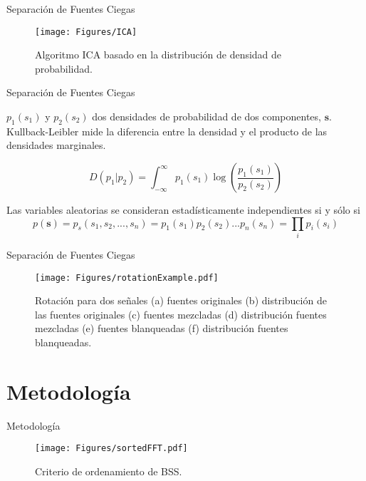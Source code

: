 \documentclass[10pt]{beamer}
\newcommand{\vect}[1]{\mathbf{#1}}
\begin{document}
\begin{frame}{Separación de Fuentes Ciegas}

\begin{figure}[ht]
\centering
\texttt{[image: Figures/ICA]}
\caption{Algoritmo ICA basado en la distribución de densidad de probabilidad.}
\label{ICA}
\end{figure}
\end{frame}

\begin{frame}{Separación de Fuentes Ciegas}


$p_1(s_1)$ y $p_2(s_2)$ dos densidades de probabilidad de dos componentes, $\vect{s}$.
Kullback-Leibler mide la diferencia entre la densidad y el producto de las densidades marginales.

\begin{equation}
    D(p_1|p_2)=\int_{-\infty}^{\infty}p_1(s_1)\log\left(\frac{p_1(s_1)}{p_2(s_2)}\right) 
\end{equation} 

Las variables aleatorias se consideran estadísticamente independientes si y sólo si
\begin{equation}
p(\vect{s})=p_{s}(s_{1},s_{2},...,s_{n})=p_{1}(s_{1})p_{2}(s_{2})...p_{n}(s_{n})=\prod_i{p_i(s_i)}
\end{equation}
    
    
\end{frame}




\begin{frame}{Separación de Fuentes Ciegas}
\begin{figure}[h]
\centering
\texttt{[image: Figures/rotationExample.pdf]}
\caption{Rotación para dos señales (a) fuentes originales (b) distribución de las fuentes originales (c) fuentes mezcladas (d) distribución fuentes mezcladas (e) fuentes blanqueadas (f) distribución fuentes blanqueadas. }
\label{SOS}
\end{figure}
\end{frame}

\section{Metodología}

\begin{frame}{Metodología}
\begin{figure}[ht]
\centering
\texttt{[image: Figures/sortedFFT.pdf]}
\caption{Criterio de ordenamiento de BSS.}
\label{sortedfft}
\end{figure}
\end{frame}
\end{document}
